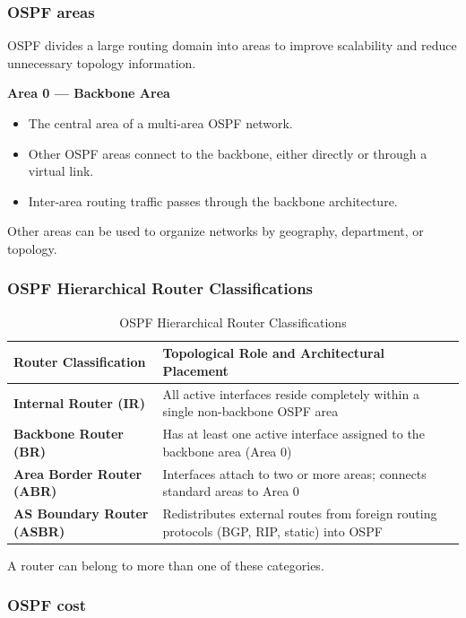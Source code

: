 \subsubsection{OSPF areas}

OSPF divides a large routing domain into areas to improve scalability and reduce unnecessary topology information.

\textbf{Area 0 --- Backbone Area}

\begin{itemize}
\item The central area of a multi-area OSPF network.
\item Other OSPF areas connect to the backbone, either directly or through a virtual link.
\item Inter-area routing traffic passes through the backbone architecture.
\end{itemize}

Other areas can be used to organize networks by geography, department, or topology.

\subsubsection{OSPF Hierarchical Router Classifications}
\begin{table}[htbp]
\centering
\caption{OSPF Hierarchical Router Classifications}
\label{tab:ospf_router_types}
\begin{tabularx}{\textwidth}{p{4.2cm} X}
\toprule
\textbf{Router Classification} & \textbf{Topological Role and Architectural Placement} \\
\midrule
\textbf{Internal Router (IR)} & All active interfaces reside completely within a single non-backbone OSPF area \\
\textbf{Backbone Router (BR)} & Has at least one active interface assigned to the backbone area (Area 0) \\
\textbf{Area Border Router (ABR)} & Interfaces attach to two or more areas; connects standard areas to Area 0 \\
\textbf{AS Boundary Router (ASBR)} & Redistributes external routes from foreign routing protocols (BGP, RIP, static) into OSPF \\
\bottomrule
\end{tabularx}
\end{table}


A router can belong to more than one of these categories.

\subsubsection{OSPF cost}

